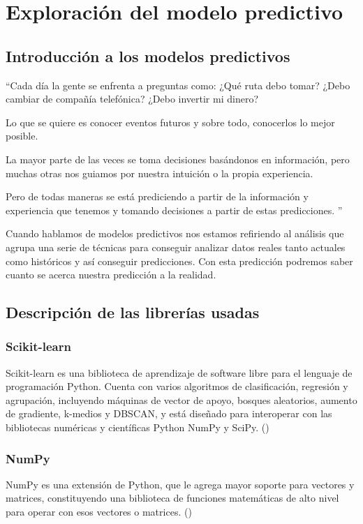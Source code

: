 \cleardoublepage

\chapter{Exploración del modelo predictivo}
\label{makereference4}

\section{Introducción a los modelos predictivos}
\label{makereference4.1}

 ``Cada día la gente se enfrenta a preguntas como: ¿Qué ruta debo tomar? ¿Debo cambiar de compañía telefónica? ¿Debo invertir mi dinero?
 
Lo que se quiere es conocer eventos futuros y sobre todo, conocerlos lo mejor posible.

La mayor parte de las veces se toma decisiones basándonos en información, pero muchas otras nos guiamos por nuestra intuición o la propia experiencia.

Pero de todas maneras se está prediciendo a partir de la información y experiencia que tenemos y tomando decisiones a partir de estas predicciones. '' 


Cuando hablamos de modelos predictivos nos estamos refiriendo al análisis que agrupa una serie de técnicas para conseguir analizar datos reales tanto actuales como históricos y así conseguir predicciones. Con esta predicción podremos saber cuanto se acerca nuestra predicción a la realidad.

\section{Descripción de las librerías usadas}
\label{makereference4.2}
	\subsection{Scikit-learn}
	\label{makereference4.2.1}
	Scikit-learn es una biblioteca de aprendizaje de software libre para el lenguaje de programación Python. Cuenta con varios algoritmos de clasificación, regresión y agrupación, incluyendo máquinas de vector de apoyo, bosques aleatorios, aumento de gradiente, k-medios y DBSCAN, y está diseñado para interoperar con las bibliotecas numéricas y científicas Python NumPy y SciPy. (\cite{ARP:Scikit:2017})
	
	\subsection{NumPy}
	\label{makereference4.2.2}
	NumPy es una extensión de Python, que le agrega mayor soporte para vectores y matrices, constituyendo una biblioteca de funciones matemáticas de alto nivel para operar con esos vectores o matrices. (\cite{ARP:Numpy:2017})
	
